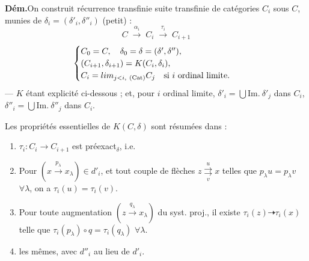 \documentclass[11pt,a4paper]{article}
\begin{document}
\textbf{Dém.}\quad On construit  \struck{\ill{}} récurrence transfinie
 suite transfinie de  catégories $C_i$ sous $C$, munies de
$\delta_i = (\delta'_i, \delta''_i)$ (petit) :
\[
  C \;\xrightarrow{\ \alpha_i\ }\; C_i \;\xrightarrow{\ \tau_i\ }\; C_{i+1}
\]
\[
\begin{cases}
  C_0 = C, \quad \delta_0 = \delta = (\delta', \delta''), \\
  (C_{i+1}, \delta_{i+1}) = K(C_i, \delta_i), \\
  C_i = \varinjlim_{j<i,\ (\mathrm{Cat})} C_j \quad \text{si $i$ ordinal limite.}
\end{cases}
\]
 — $K$
étant explicité ci-dessous ; et, pour $i$ ordinal limite,
$\delta'_i = \bigcup \mathrm{Im.}\ \delta'_j$ dans $C_i$,
$\delta''_i = \bigcup \mathrm{Im.}\ \delta''_j$ dans $C_i$.

Les propriétés essentielles de $K(C,\delta)$ sont résumées dans :

\begin{enumerate}
  \item[a)] $\tau_i : C_i \to C_{i+1}$ est  préexact$_{\delta}$, i.e.
  \item[$a'_1$)]  Pour
    $(x \xrightarrow{\,p_\lambda\,} x_\lambda) \in d'_i$, et tout 
    couple de flèches $z \overset{u}{\underset{v}{\rightrightarrows}} x$ telles
    que $p_\lambda u = p_\lambda v$ $\forall \lambda$, on a
    $\tau_i(u) = \tau_i(v)$.
  \item[$a'_2$)] Pour toute \struck{\ill{}} augmentation
    $(z \xrightarrow{\,q_\lambda\,} x_\lambda)$ du syst. proj., il existe
    $\tau_i(z) \dashrightarrow \tau_i(x)$ telle que
    $\tau_i(p_\lambda) \circ q = \tau_i(q_\lambda)$ $\forall \lambda$.
  \item[$a''$)] \struck{\ill{}} les mêmes, avec $d''_i$ au lieu de $d'_i$.
\end{enumerate}

\end{document}
